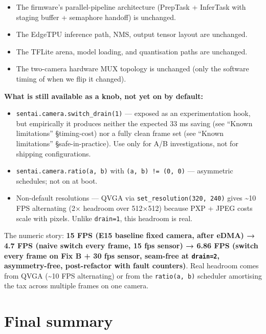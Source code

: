 \begin{itemize}
\tightlist
\item
  The firmware's parallel-pipeline architecture (PrepTask + InferTask
  with staging buffer + semaphore handoff) is unchanged.
\item
  The EdgeTPU inference path, NMS, output tensor layout are unchanged.
\item
  The TFLite arena, model loading, and quantisation paths are unchanged.
\item
  The two-camera hardware MUX topology is unchanged (only the software
  timing of when we flip it changed).
\end{itemize}

\textbf{What is still available as a knob, not yet on by default:}

\begin{itemize}
\tightlist
\item
  \texttt{sentai.camera.switch\_drain(1)} --- exposed as an
  experimentation hook, but empirically it produces neither the expected
  33 ms saving (see ``Known limitations'' §timing-cost) nor a fully
  clean frame set (see ``Known limitations'' §safe-in-practice). Use
  only for A/B investigations, not for shipping configurations.
\item
  \texttt{sentai.camera.ratio(a,\ b)} with \texttt{(a,\ b)\ !=\ (0,\ 0)}
  --- asymmetric schedules; not on at boot.
\item
  Non-default resolutions --- QVGA via
  \texttt{set\_resolution(320,\ 240)} gives \textasciitilde10 FPS
  alternating (2× headroom over 512×512) because PXP + JPEG costs scale
  with pixels. Unlike \texttt{drain=1}, this headroom is real.
\end{itemize}

The numeric story: \textbf{15 FPS (E15 baseline fixed camera, after
eDMA) → 4.7 FPS (naive switch every frame, 15 fps sensor) → 6.86 FPS
(switch every frame on Fix B + 30 fps sensor, seam-free at
\texttt{drain=2}, asymmetry-free, post-refactor with fault counters)}.
Real headroom comes from QVGA (\textasciitilde10 FPS alternating) or
from the \texttt{ratio(a,\ b)} scheduler amortising the tax across
multiple frames on one camera.

\section{Final summary}\label{final-summary}

